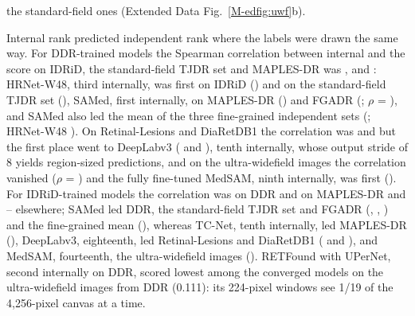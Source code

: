 the standard-field ones (Extended Data Fig.~\ref{M-edfig:uwf}b).

Internal rank predicted independent rank where the labels were drawn the same way. For DDR-trained models the Spearman correlation between internal \mAUPR{} and the score on IDRiD, the standard-field TJDR set and MAPLES-DR was ,  and : HRNet-W48, third internally, was first on IDRiD () and on the standard-field TJDR set (), SAMed, first internally, on MAPLES-DR () and FGADR (; $\rho$ = ), and SAMed also led the mean of the three fine-grained independent sets (; HRNet-W48 ). On Retinal-Lesions and DiaRetDB1 the correlation was  and  but the first place went to DeepLabv3 ( and ), tenth internally, whose output stride of 8 yields region-sized predictions, and on the ultra-widefield images the correlation vanished ($\rho$ = ) and the fully fine-tuned MedSAM, ninth internally, was first (). For IDRiD-trained models the correlation was  on DDR and  on MAPLES-DR and -- elsewhere; SAMed led DDR, the standard-field TJDR set and FGADR (, , ) and the fine-grained mean (), whereas TC-Net, tenth internally, led MAPLES-DR (), DeepLabv3, eighteenth, led Retinal-Lesions and DiaRetDB1 ( and ), and MedSAM, fourteenth, the ultra-widefield images (). RETFound with UPerNet, second internally on DDR, scored lowest among the converged models on the ultra-widefield images from DDR (0.111): its 224-pixel windows see 1/19 of the 4,256-pixel canvas at a time.

